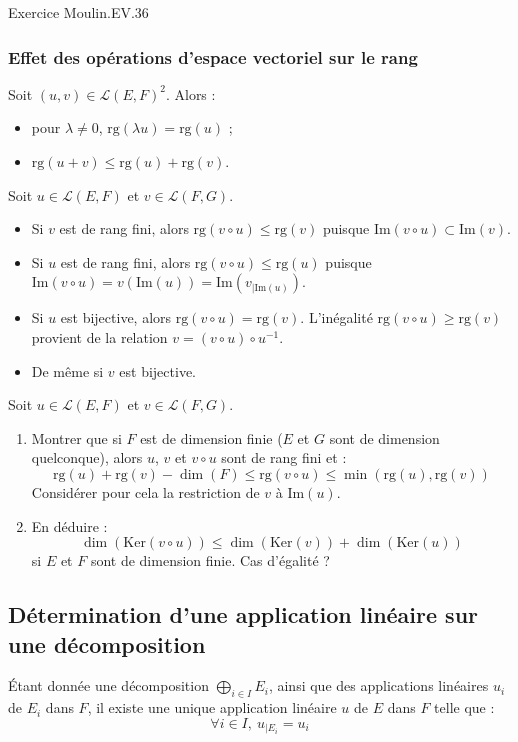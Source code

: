 \documentclass[french]{article}
\newcommand{\inv}{^{-1}}
\renewcommand{\ker}{\text{Ker}}
\newcommand{\rg}{\text{rg}}
\theoremstyle{plain}
\theoremstyle{definition}
\theoremstyle{remark}
\begin{document}
Exercice Moulin.EV.36

\subsubsection*{Effet des opérations d'espace vectoriel sur le rang}

Soit $(u,v)\in\mathcal{L}(E,F)^2$. Alors :
\begin{itemize}
	\item pour $\lambda\ne 0$, $\rg(\lambda u)=\rg(u)$ ;
	\item $\rg(u+v)\leqslant\rg(u)+\rg(v)$.
\end{itemize}
Soit $u\in\mathcal{L}(E,F)$ et $v\in\mathcal{L}(F,G)$.
\begin{itemize}
	\item Si $v$ est de rang fini, alors $\rg(v\circ u)\leqslant\rg(v)$ puisque $\text{Im}(v\circ u)\subset\text{Im}(v)$.
	\item Si $u$ est de rang fini, alors $\rg(v\circ u)\leqslant\rg(u)$ puisque $\text{Im}(v\circ u)=v(\text{Im}(u))=\text{Im}(v_{\mid \text{Im}(u)})$.
	\item Si $u$ est bijective, alors $\rg(v\circ u)=\rg(v)$. L'inégalité $\rg(v\circ u)\geqslant\rg(v)$ provient de la relation $v=(v\circ u)\circ u\inv$.
	\item De même si $v$ est bijective.
\end{itemize}

\begin{exo}
	Soit $u\in\mathcal{L}(E,F)$ et $v\in\mathcal{L}(F,G)$.
	\begin{enumerate}
		\item Montrer que si $F$ est de dimension finie ($E$ et $G$ sont de dimension quelconque), alors $u$, $v$ et $v\circ u$ sont de rang fini et : $$\rg(u)+\rg(v)-\dim(F)\leqslant\rg(v\circ u)\leqslant\min(\rg(u),\rg(v))$$ Considérer pour cela la restriction de $v$ à $\text{Im}(u)$.
		\item En déduire : $$\dim(\ker(v\circ u))\leqslant\dim(\ker(v))+\dim(\ker(u))$$ si $E$ et $F$ sont de dimension finie. Cas d'égalité ?
	\end{enumerate}
\end{exo}

\subsection{Détermination d'une application linéaire sur une décomposition}

\begin{prop}%
	Étant donnée une décomposition $\displaystyle\bigoplus_{i\in I} E_i$, ainsi que des applications linéaires $u_i$ de $E_i$ dans $F$, il existe une unique application linéaire $u$ de $E$ dans $F$ telle que : $$\forall i\in I,\ u_{\mid E_i}=u_i$$
\end{prop}
\end{document}
